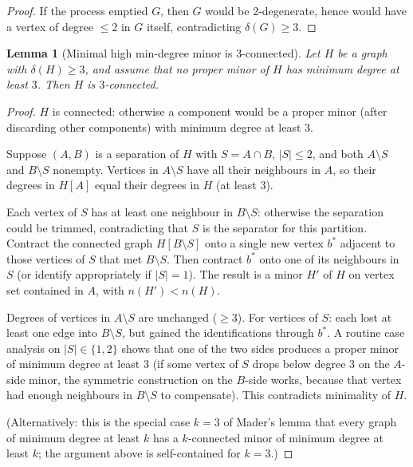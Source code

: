 \documentclass[11pt]{article}
\newtheorem{lemma}[theorem]{Lemma}
\theoremstyle{definition}
\begin{document}
\begin{proof}
If the process emptied \(G\), then \(G\) would be \(2\)-degenerate, hence would
have a vertex of degree \(\le 2\) in \(G\) itself, contradicting \(\delta(G)\ge 3\).
\end{proof}

\begin{lemma}[Minimal high min-degree minor is \(3\)-connected]
\label{lem:min-3conn}
Let \(H\) be a graph with \(\delta(H)\ge 3\), and assume that no proper minor of
\(H\) has minimum degree at least \(3\). Then \(H\) is \(3\)-connected.
\end{lemma}

\begin{proof}
\(H\) is connected: otherwise a component would be a proper minor (after
discarding other components) with minimum degree at least \(3\).

Suppose \((A,B)\) is a separation of \(H\) with \(S=A\cap B\), \(|S|\le 2\), and
both \(A\setminus S\) and \(B\setminus S\) nonempty. Vertices in \(A\setminus S\)
have all their neighbours in \(A\), so their degrees in \(H[A]\) equal their
degrees in \(H\) (at least \(3\)).

Each vertex of \(S\) has at least one neighbour in \(B\setminus S\): otherwise
the separation could be trimmed, contradicting that \(S\) is the separator for
this partition. Contract the connected graph \(H[B\setminus S]\) onto a single
new vertex \(b^*\) adjacent to those vertices of \(S\) that met \(B\setminus S\).
Then contract \(b^*\) onto one of its neighbours in \(S\) (or identify
appropriately if \(|S|=1\)). The result is a minor \(H'\) of \(H\) on vertex set
contained in \(A\), with \(n(H')<n(H)\).

Degrees of vertices in \(A\setminus S\) are unchanged (\(\ge 3\)). For vertices
of \(S\): each lost at least one edge into \(B\setminus S\), but gained the
identifications through \(b^*\). A routine case analysis on \(|S|\in\{1,2\}\)
shows that one of the two sides produces a proper minor of minimum degree at
least \(3\) (if some vertex of \(S\) drops below degree \(3\) on the \(A\)-side
minor, the symmetric construction on the \(B\)-side works, because that vertex
had enough neighbours in \(B\setminus S\) to compensate). This contradicts
minimality of \(H\).

(Alternatively: this is the special case \(k=3\) of Mader's lemma that every
graph of minimum degree at least \(k\) has a \(k\)-connected minor of minimum
degree at least \(k\); the argument above is self-contained for \(k=3\).)
\end{proof}
\end{document}
